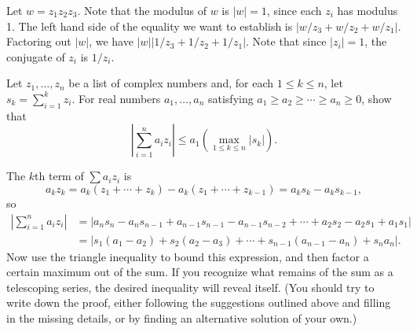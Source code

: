 \smallskip
\begin{hint}
Let $w =  z_1 z_2 z_3$. Note that the modulus of $w$ is $|w| = 1$, since each $z_i$ has modulus 1.
The left hand side of the equality we want to establish is
$| w/z_3 + w/z_2 + w/z_1 |$.
Factoring out $|w|$, we have $|w| |1/z_3 + 1/z_2 + 1/z_1|$.
Note that since $|z_i|=1$, the conjugate of $z_i$ is $1/z_i$.
\end{hint}
\probskip

\begin{prob} 
Let $z_1, \dots, z_n$ be a list of complex
numbers and, for each $1 \leq k \leq n$, 
let $s_k = \sum_{i=1}^k z_i$. For real numbers
$a_1, \dots, a_n$ satisfying 
$a_1 \geq a_2 \geq \cdots \geq a_n \geq 0$, 
show that
\begin{equation}
\label{eq:Abels}  
\left| \sum_{i=1}^n a_i z_i \right| 
\leq a_1 \left( \max_{1 \leq k \leq n} |s_k|\right).
\end{equation}
\end{prob}
\smallskip
\begin{hint}
The $k$th term of $\sum a_i z_i$ is 
\[
a_k z_k = a_k (z_1+\cdots + z_k) - a_k (z_1+\cdots + z_{k-1})
= a_k s_k - a_k s_{k-1},
\]
so
\begin{align*}
\left| \sum_{i=1}^n a_i z_i \right|  
&= \left|a_n s_n - a_n s_{n-1}
+ a_{n-1} s_{n-1} - a_{n-1} s_{n-2} + \cdots +a_2 s_2 - a_2 s_1 + a_1
s_1\right|\\
&=\left| s_1(a_1-a_2)+ s_2(a_2-a_3) + \cdots + s_{n-1}(a_{n-1}-a_n) + s_{n}a_n
\right|.
\end{align*}
Now use the triangle inequality to bound this expression, and then factor
a certain maximum out of the sum. If you recognize what remains of the sum as a
telescoping series, the desired inequality will reveal itself. 
(You should try to write down the proof, either following the
suggestions outlined above and filling in the missing details, or by finding an
alternative solution of your own.)
\end{hint}
\probskip



